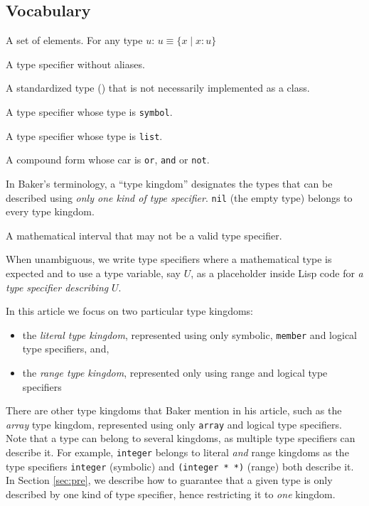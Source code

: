 \documentclass[format=sigconf]{acmart}
\newcommand\code[2][\small]{\sloppy\texttt{#1#2}}
\theoremstyle{definition}
\begin{document}
\subsection{Vocabulary}
\begin{description}[leftmargin=8em,style=nextline]
  \item[type] A set of elements. For any type $u$: $u \equiv \{x \mid x\!:\!u\}$
  \item[canonical t.s.] A type specifier without aliases.
  \item[primitive type] A standardized type
    (\cite{bib:ansi.94.cl.type-specifiers}) that is not necessarily implemented
    as a class.
  \item[symbolic form] A type specifier whose type is \code{symbol}.
  \item[compound form] A type specifier whose type is \code{list}.
  \item[logical form] A compound form whose car is \code{or}, \code{and} or \code{not}.
  \item[kingdom] In Baker's terminology, a ``type kingdom'' designates the types
    that can be described using \emph{only one kind of type specifier}.
    \code{nil} (the empty type) belongs to every type kingdom.
  \item[interval] A mathematical interval that may not be a valid type specifier.
  \item[type $\approx$ t.s.] When unambiguous, we write type specifiers where a
    mathematical type is expected and to use a type variable, say $U$, as a
    placeholder inside Lisp code for \emph{a type specifier describing} $U$.
\end{description}

In this article we focus on two particular type kingdoms:
\begin{itemize}
\item the \emph{literal type kingdom}, represented using only
  symbolic, \code{member} and logical type specifiers, and,
\item the \emph{range type kingdom}, represented only using
  range and logical type specifiers
\end{itemize}

There are other type kingdoms that Baker mention in his article, such as the
\emph{array} type kingdom, represented using only \code{array} and logical type
specifiers. Note that a type can belong to several kingdoms, as multiple type
specifiers can describe it. For example, \code{integer} belongs to literal
\emph{and} range kingdoms as the type specifiers \code{integer} (symbolic) and
\code{(integer * *)} (range) both describe it. In Section \ref{sec:pre}, we
describe how to guarantee that a given type is only described by one kind of
type specifier, hence restricting it to \emph{one} kingdom.
\end{document}
